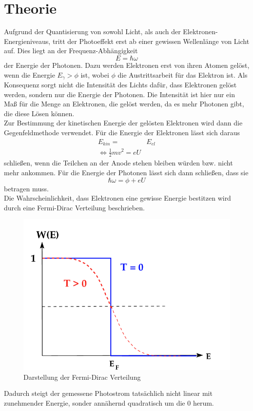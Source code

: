 \section{Theorie}
\label{sec:Theorie}

Aufgrund der Quantisierung von sowohl Licht, als auch der Elektronen-Energieniveaus, tritt der Photoeffekt
erst ab einer gewissen Wellenlänge von Licht auf. Dies liegt an der Frequenz-Abhängigkeit
\begin{equation}
    E=\hbar \omega
    \label{eqn:photon}
\end{equation}
\noindent der Energie der Photonen. Dazu werden Elektronen erst von ihren Atomen gelöst, wenn die Energie $E_\gamma > \phi$
ist, wobei $\phi$ die Austrittsarbeit für das Elektron ist. Als Konsequenz sorgt nicht die Intensität des Lichts dafür,
dass Elektronen gelöst werden, sondern nur die Energie der Photonen. Die Intensität ist hier nur ein Maß für die Menge
an Elektronen, die gelöst werden, da es mehr Photonen gibt, die diese Lösen können. \\
Zur Bestimmung der kinetischen Energie der gelösten Elektronen wird dann die Gegenfeldmethode verwendet. Für die Energie 
der Elektronen lässt sich daraus
\begin{align}
    E_{kin}=&E_{el}\\
    \iff \frac{1}{2}mv^2=eU
    \label{eqn:ekin}
\end{align}
\noindent schließen, wenn die Teilchen an der Anode stehen bleiben würden bzw. nicht mehr ankommen.
Für die Energie der Photonen lässt sich dann schließen, dass sie
\begin{equation}
    \hbar \omega=\phi+eU
    \label{eqn:hquer}
\end{equation}
\noindent betragen muss. \\
\noindent Die Wahrscheinlichkeit, dass Elektronen eine gewisse Energie bestitzen wird durch eine Fermi-Dirac Verteilung beschrieben.
\begin{figure}[H]
    \includegraphics{Bilder/fermi-dirac.png}
    \centering
    \caption{Darstellung der Fermi-Dirac Verteilung}
    \label{fig:fermidirac}
\end{figure}
\noindent Dadurch steigt der gemessene Photostrom tatsächlich nicht linear mit zunehmender Energie, sonder annähernd quadratisch
um die $0$ herum.
\cite{sample}
